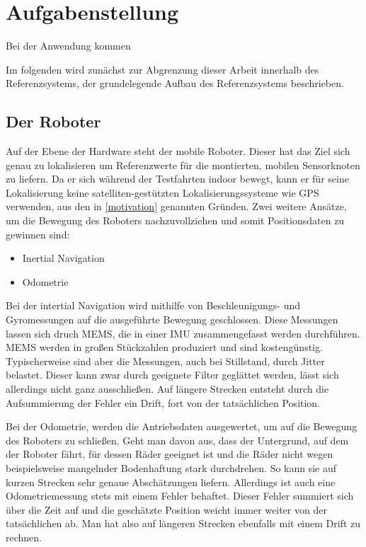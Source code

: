 \section{Aufgabenstellung}
\label{sec:aufgabenstellung}

Bei der Anwendung kommen

Im folgenden wird zunächst zur Abgrenzung dieser Arbeit innerhalb des
Referenzsystems, der grundelegende Aufbau des Referenzsystems beschrieben. 

\subsection{Der Roboter}
\label{sub:roboter}

Auf der Ebene der Hardware steht der mobile Roboter. Dieser hat das Ziel sich
genau zu lokalisieren um Referenzwerte für die montierten, mobilen Sensorknoten zu
liefern. Da er sich während der Testfahrten indoor bewegt, kann er
für seine Lokalisierung keine satelliten-gestützten Lokalisierungssysteme wie
GPS verwenden, aus den in \ref{motivation} genannten Gründen. Zwei weitere
Ansätze, um die Bewegung des Roboters nachzuvollziehen und somit Positionsdaten
zu gewinnen sind:

\begin{itemize}
  \item Inertial Navigation
  \item Odometrie
\end{itemize}

Bei der intertial Navigation wird mithilfe von Beschleunigungs- und
Gyromessungen auf die ausgeführte Bewegung geschlossen. Diese Messungen lassen
sich druch \gls{MEMS}, die in einer 
\gls{IMU} zusammengefasst werden durchführen.
\gls{MEMS} werden in großen Stückzahlen produziert und sind kostengünstig.
Typischerweise sind aber die Messungen, auch bei Stillstand, durch Jitter belastet.
Dieser kann zwar durch geeignete Filter geglättet werden, lässt sich allerdings
nicht ganz ausschließen. Auf längere Strecken entsteht durch die Aufsummierung
der Fehler ein Drift, fort von der tatsächlichen Position.

Bei der Odometrie, werden die Antriebsdaten ausgewertet, um auf die Bewegung
des Roboters zu schließen. Geht man davon aus, dass der Untergrund, auf dem der
Roboter fährt, für dessen Räder geeignet ist und die Räder nicht wegen
beispielsweise mangelnder Bodenhaftung stark durchdrehen. So kann sie auf
kurzen Strecken sehr genaue Abschätzungen liefern. Allerdings ist auch eine
Odometriemessung stets mit einem Fehler behaftet. Dieser Fehler summiert sich
über die Zeit auf und die geschätzte Position weicht immer weiter von der
tatsächlichen ab. Man hat also auf längeren Strecken ebenfalls mit einem Drift
zu rechnen.

